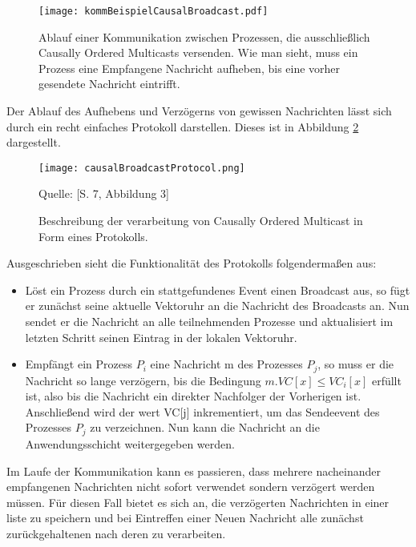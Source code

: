 \begin{figure}[ht]
	\centering
	\texttt{[image: kommBeispielCausalBroadcast.pdf]}
	\caption[Kommunikation durch Causally Ordered Multicasts]{Ablauf einer Kommunikation zwischen Prozessen, die ausschließlich Causally Ordered Multicasts versenden. Wie man sieht, muss ein Prozess eine Empfangene Nachricht aufheben, bis eine vorher gesendete Nachricht eintrifft.}
	\label{figure:causalbroadcast}
\end{figure}
\FloatBarrier

Der Ablauf des Aufhebens und Verzögerns von gewissen Nachrichten lässt sich durch ein recht einfaches Protokoll darstellen. Dieses ist in Abbildung \ref{figure:causalBroadcastProtocol} dargestellt.

\begin{figure}[ht]
	\centering
	\texttt{[image: causalBroadcastProtocol.png]}
	\caption[Protokoll für den Causally Ordered Multicast]{Beschreibung der verarbeitung von Causally Ordered Multicast in Form eines Protokolls.}
	Quelle: \cite{Baldoni:2002:FDC:1435723.1437765}[S. 7, Abbildung 3]
	\label{figure:causalBroadcastProtocol}
\end{figure}
\FloatBarrier

Ausgeschrieben sieht die Funktionalität des Protokolls folgendermaßen aus:

\begin{itemize}
	\item Löst ein Prozess durch ein stattgefundenes Event einen Broadcast aus, so fügt er zunächst seine aktuelle Vektoruhr an die Nachricht des Broadcasts an. Nun sendet er die Nachricht an alle teilnehmenden Prozesse und aktualisiert im letzten Schritt seinen Eintrag in der lokalen Vektoruhr.
	\item Empfängt ein Prozess $P_i$ eine Nachricht m des Prozesses $P_j$, so muss er die Nachricht so lange verzögern, bis die Bedingung $m.VC[x] \le VC_i[x]$ erfüllt ist, also bis die Nachricht ein direkter Nachfolger der Vorherigen ist. Anschließend wird der wert VC[j] inkrementiert, um das Sendeevent des Prozesses $P_j$ zu verzeichnen. Nun kann die Nachricht an die Anwendungsschicht weitergegeben werden.
\end{itemize}

Im Laufe der Kommunikation kann es passieren, dass mehrere nacheinander empfangenen Nachrichten nicht sofort verwendet sondern verzögert werden müssen. Für diesen Fall bietet es sich an, die verzögerten Nachrichten in einer liste zu speichern und bei Eintreffen einer Neuen Nachricht alle zunächst zurückgehaltenen nach deren  zu verarbeiten.

